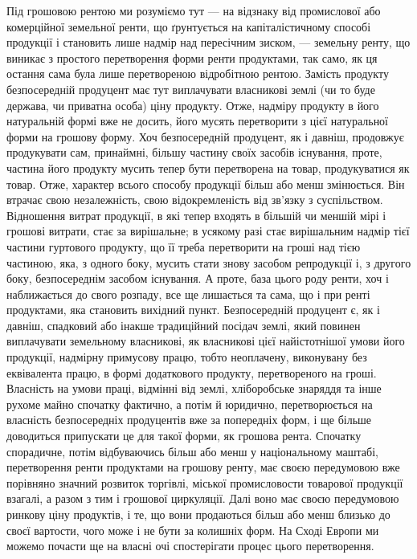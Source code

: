 Під грошовою рентою ми розуміємо тут — на відзнаку від промислової
або комерційної земельної ренти, що ґрунтується на капіталістичному способі
продукції і становить лише надмір над пересічним зиском, — земельну ренту,
що виникає з простого перетворення форми ренти продуктами, так само, як ця
остання сама була лише перетвореною відробітною рентою. Замість продукту
безпосередній продуцент має тут виплачувати власникові землі (чи то буде
держава, чи приватна особа) ціну продукту. Отже, надміру продукту в його
натуральній формі вже не досить, його мусять перетворити з цієї натуральної
форми на грошову форму. Хоч безпосередній продуцент, як і давніш, продовжує
продукувати сам, принаймні, більшу частину своїх засобів існування, проте,
частина його продукту мусить тепер бути перетворена на товар, продукуватися
як товар. Отже, характер всього способу продукції більш або менш змінюється.
Він втрачає свою незалежність, свою відокремленість від зв'язку з суспільством.
Відношення витрат продукції, в які тепер входять в більшій чи меншій мірі і
грошові витрати, стає за вирішальне; в усякому разі стає вирішальним
надмір тієї частини гуртового продукту, що її треба перетворити на гроші
над тією частиною, яка, з одного боку, мусить стати знову засобом репродукції
і, з другого боку, безпосереднім засобом існування. А проте, база цього
роду ренти, хоч і наближається до свого розпаду, все ще лишається та сама,
що і при ренті продуктами, яка становить вихідний пункт. Безпосередній продуцент
є, як і давніш, спадковий або інакше традиційний посідач землі, який
повинен виплачувати земельному власникові, як власникові цієї найістотнішої
умови його продукції, надмірну примусову працю, тобто неоплачену, виконувану
без еквівалента працю, в формі додаткового продукту, перетвореного на
гроші. Власність на умови праці, відмінні від землі, хліборобське знаряддя та
інше рухоме майно спочатку фактично, а потім й юридично, перетворюється на
власність безпосередніх продуцентів вже за попередніх форм, і ще більше доводиться
припускати це для такої форми, як грошова рента. Спочатку спорадичне,
потім відбуваючись більш або менш у національному маштабі, перетворення
ренти продуктами на грошову ренту, має своєю передумовою вже порівняно
значний розвиток торгівлі, міської промисловости товарової продукції взагалі, а
разом з тим і грошової циркуляції. Далі воно має своєю передумовою ринкову
ціну продуктів, і те, що вони продаються більш або менш близько до
своєї вартости, чого може і не бути за колишніх форм. На Сході Европи ми
можемо почасти ще на власні очі спостерігати процес цього перетворення.
\parbreak{}  %
